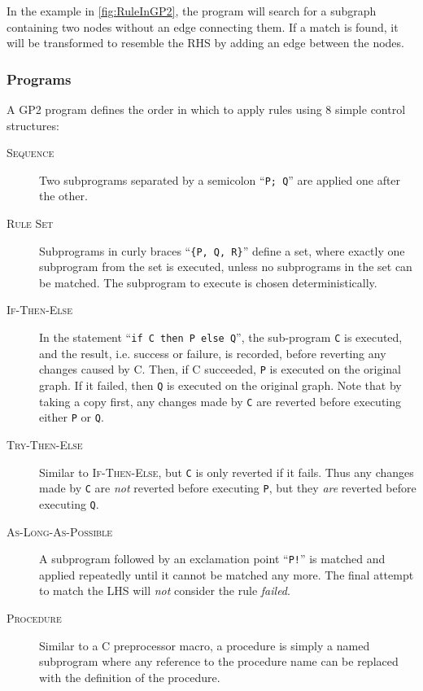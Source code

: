 \documentclass[authoryearcitations]{UoYCSproject}
\begin{document}
In the example in \autoref{fig:RuleInGP2}, the program will search for a subgraph
containing two nodes without an edge connecting them. If a match is found, it will
be transformed to resemble the RHS by adding an edge between the nodes.

\subsubsection{Programs}

A GP2 program defines the order in which to apply rules using 8 simple control
structures:

\begin{description}
    \item[\textsc{Sequence}]
    Two subprograms separated by a semicolon ``\texttt{P; Q}'' are applied
    one after the other.

    \item[\textsc{Rule Set}]
    Subprograms in curly braces ``\texttt{\{P, Q, R\}}'' define a set, where
    exactly one subprogram from the set is executed, unless no subprograms in
    the set can be matched. The subprogram to execute is chosen deterministically.

    \item[\textsc{If-Then-Else}]
    In the statement ``\texttt{if C then P else Q}'', the sub-program \texttt{C}
    is executed, and the result, i.e. success or failure, is recorded, before
    reverting any changes caused by C. Then, if C succeeded, \texttt{P} is
    executed on the original graph. If it failed, then \texttt{Q} is executed on
    the original graph. Note that by taking a copy first, any changes made by
    \texttt{C} are reverted before executing either \texttt{P} or \texttt{Q}.

    \item[\textsc{Try-Then-Else}]
    Similar to \textsc{If-Then-Else}, but \texttt{C} is only reverted if it fails.
    Thus any changes made by \texttt{C} are \emph{not} reverted before executing
    \texttt{P}, but they \emph{are} reverted before executing \texttt{Q}.

    \item[\textsc{As-Long-As-Possible}]
    A subprogram followed by an exclamation point ``\texttt{P!}'' is matched and
    applied repeatedly until it cannot be matched any more. The final attempt to
    match the LHS will \emph{not} consider the rule \emph{failed}.

    \item[\textsc{Procedure}]
    Similar to a C preprocessor macro, a procedure is simply a named subprogram
    where any reference to the procedure name can be replaced with the definition
    of the procedure.


\end{description}
\end{document}
